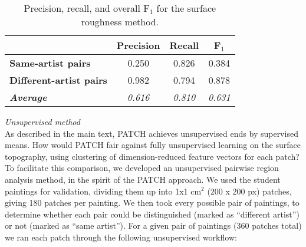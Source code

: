 \documentclass[11pt]{article}
\begin{document}
\begin{table}[htb]
\renewcommand{\arraystretch}{1.05}
\centering
{}\selectfont
\begin{tabular}{|l|c|c|c|}
\hline
 &\textbf{Precision}&\textbf{Recall}&\textbf{F$_1$}\\
\hline
\textbf{Same-artist pairs}&0.250&0.826&0.384\\
\textbf{Different-artist pairs}&0.982&0.794&0.878\\
\textbf{\em Average}&\textit{0.616}&\textit{0.810}&\textit{0.631}\\
\hline
\end{tabular}

\caption{Precision, recall, and overall F$_1$ for the surface roughness method.}
\label{table:S2}

\end{table}

\noindent\textit{Unsupervised method}\\


As described in the main text, PATCH achieves unsupervised ends by supervised means. How would PATCH fair against fully unsupervised learning on the surface topography, using clustering of dimension-reduced feature vectors for each patch? To facilitate this comparison, we developed an unsupervised pairwise region analysis method, in the spirit of the PATCH approach. We used the student paintings for validation, dividing them up into 1x1 cm$^2$ (200 x 200 px) patches, giving 180 patches per painting. We then took every possible pair of paintings, to determine whether each pair could be distinguished (marked as “different artist”) or not (marked as “same artist”). For a given pair of paintings (360 patches total) we ran each patch through the following unsupervised workflow:
\end{document}
